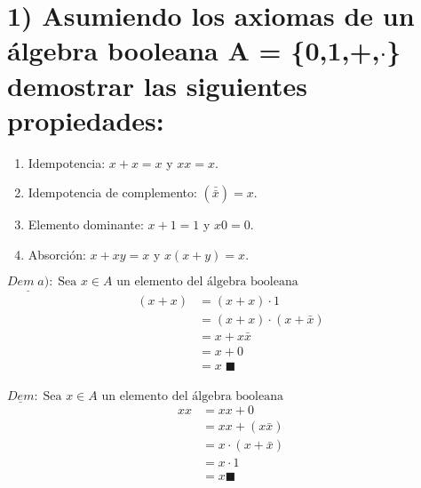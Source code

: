 \chapter*{1) Asumiendo los axiomas de un álgebra booleana  A = \{{0,1},+,$\cdot$\} demostrar las siguientes propiedades:}
\begin{enumerate}[label=\alph*)]
	\item Idempotencia: $x+x = x $ y $ xx = x$.
	\item Idempotencia de complemento:  $(\bar{\bar{x}})= x$.
	\item Elemento dominante: $x+1 = 1$ y $x0 = 0$.
	\item Absorción: $x+xy = x$ y $x(x+y) = x$.
\end{enumerate}
\begin{multicols}{2}
	\noindent
	$\underline{Dem \;a)}:\; \text{Sea $x\in A$ un elemento del álgebra booleana}$
	\begin{align*}
		(x+x) & =(x+x)\cdot 1           \\
		      & =(x+x)\cdot (x+\bar{x}) \\
		      & =x + x\bar{x}           \\
		      & =x + 0                  \\
		      & =x\; \blacksquare       \\
	\end{align*}

	\columnbreak

	\noindent
	$\underline{Dem}:\; \text{Sea $x\in A$ un elemento del álgebra booleana}$
	\begin{align*}
		xx & =xx+0              \\
		   & =xx+(x\bar{x})     \\
		   & =x\cdot(x+\bar{x}) \\
		   & =x\cdot 1          \\
		   & =x \blacksquare    
	\end{align*}
\end{multicols}
